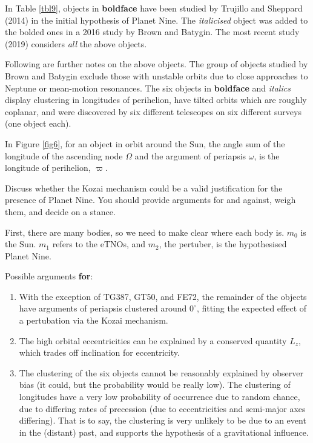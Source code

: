 \documentclass[a4paper,11pt]{exam}
\begin{document}
\begin{questions}
{\vspace*{-10pt}
In Table \ref{tbl9}, objects in \textbf{boldface} have been studied by Trujillo and Sheppard (2014) in the initial hypothesis of Planet Nine. The \textit{italicised} object was added to the bolded ones in a 2016 study by Brown and Batygin. The most recent study (2019) considers \textit{all} the above objects.

Following are further notes on the above objects. The group of objects studied by Brown and Batygin exclude those with unstable orbits due to close approaches to Neptune or mean-motion resonances. The six objects in \textbf{boldface} and \textit{italics} display clustering in longitudes of perihelion, have tilted orbits which are roughly coplanar, and were discovered by six different telescopes on six different surveys (one object each).
\vspace*{-10pt}
}

\question[4]\label{3e}
	In Figure \ref{fig6}, for an object in orbit around the Sun, the angle sum of the longitude of the ascending node $ \Omega $ and the argument of periapsis $ \omega $, is the longitude of perihelion, $ \varpi $. 
	 
	Discuss whether the Kozai mechanism could be a valid justification for the presence of Planet Nine. You should provide arguments for and against, weigh them, and decide on a stance.
	\droppoints
	\begin{solution}
		First, there are many bodies, so we need to make clear where each body is. $m_0$ is the Sun. $m_1$ refers to the eTNOs, and $m_2$, the pertuber, is the hypothesised Planet Nine.
		
		Possible arguments \textbf{for}:
		\begin{enumerate}[leftmargin=13pt]
			\item With the exception of TG387, GT50, and FE72, the remainder of the objects have arguments of periapsis clustered around $0^\circ$, fitting the expected effect of a pertubation via the Kozai mechanism.
			
			\item The high orbital eccentricities can be explained by a conserved quantity $L_z$, which trades off inclination for eccentricity.
			
			\item The clustering of the six objects cannot be reasonably explained by observer bias (it could, but the probability would be really low). The clustering of longitudes have a very low probability of occurrence due to random chance, due to differing rates of precession (due to eccentricities and semi-major axes differing). That is to say, the clustering is very unlikely to be due to an event in the (distant) past, and supports the hypothesis of a gravitational influence.
		\end{enumerate}
		

\end{solution}
\end{questions}
\end{document}
